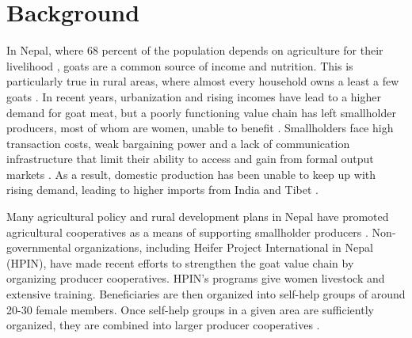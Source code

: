 \documentclass[11pt]{article}
\begin{document}

\section{Background} \label{sec:background}

In Nepal, where 68 percent of the population depends on agriculture for their livelihood %
\citep{international_labor_organization_ilo_2016}, goats are a common source of income and nutrition. This is particularly true in rural areas, where almost every household owns a least a few goats \citep{upreti_food_2009}. In recent years, urbanization and rising incomes have lead to a higher demand for goat meat, but a poorly functioning value chain has left smallholder producers, most of whom are women, unable to benefit \citep{ashby_investing_2009,choudhary_pro-poor_2011,gurung_empowering_2015}. Smallholders face high transaction costs, weak bargaining power and a lack of communication infrastructure that limit their ability to access and gain from formal output markets \citep{barrett_smallholder_2008}. As a result, domestic production has been unable to keep up with rising demand, leading to higher imports from India and Tibet \citep{heifer_international_nepal_study_2012}.

Many agricultural policy and rural development plans in Nepal have promoted agricultural cooperatives as a means of supporting smallholder producers \citep{agricultural_development_strategy_agricultural_2015}. Non-governmental organizations, including Heifer Project International in Nepal (HPIN), have made recent efforts to strengthen the goat value chain by organizing producer cooperatives. HPIN’s programs give women livestock and extensive training. Beneficiaries are then organized into self-help groups of around 20-30 female members. Once self-help groups in a given area are sufficiently organized, they are combined into larger producer cooperatives \citep{janzen_short-term_2018}.
\end{document}

